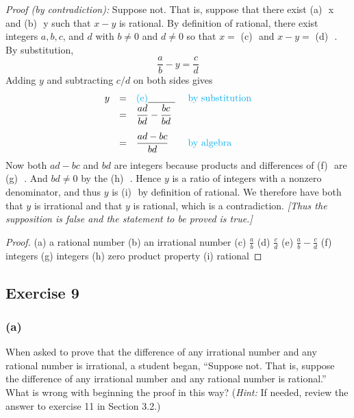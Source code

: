 \documentclass[14pt]{extarticle}
\newcommand{\dps}{\displaystyle}
\newcommand{\fbl}{\underline{\hspace{1cm}}\,\,}
\newcommand{\cy}{\color{cyan}}
\begin{document}
    {\it Proof (by contradiction):} Suppose not. That is, suppose that there exist {\cy (a)} \fbl x and {\cy (b)} \fbl y such that $x - y$ is rational. By definition of rational, there exist integers $a, b, c$, and $d$ with $b \neq 0$ and $d \neq 0$ so that $x =$ {\cy (c)} \fbl and $x - y =$ {\cy (d)} \fbl. By substitution,
\[
    \frac{a}{b} - y = \frac{c}{d}
\]
Adding $y$ and subtracting $c/d$ on both sides gives
\[
    \begin{array}{rcll}
        y & = & \text{\cy (e)} \fbl               & \text{\cy by substitution} \\
        \vspace{0.3cm}
          & = & \dps\frac{ad}{bd} - \frac{bc}{bd} &                            \\
          & = & \dps\frac{ad - bc}{bd}            & \text{\cy by algebra}      \\
    \end{array}
\]
Now both $ad - bc$ and $bd$ are integers because products and differences of {\cy (f)} \fbl are {\cy (g)} \fbl. And $bd \neq 0$ by the {\cy (h)} \fbl. Hence $y$ is a ratio of integers with a nonzero denominator, and thus $y$ is {\cy (i)} \fbl by definition of rational. We therefore have both that $y$ is irrational and that $y$ is rational, which is a contradiction. {\it[Thus the supposition is false and the
            statement to be proved is true.]}

\begin{proof}
    (a) a rational number
    (b) an irrational number
    (c) $\frac{a}{b}$
    (d) $\frac{c}{d}$
    (e) $\frac{a}{b} - \frac{c}{d}$
    (f) integers
    (g) integers
    (h) zero product property
    (i) rational
\end{proof}

\subsection{Exercise 9}

\subsubsection{(a)}
When asked to prove that the difference of any irrational number and any rational number is irrational, a student began, “Suppose not. That is, suppose the difference of any irrational number and any rational number is rational.” What is wrong with beginning the proof in this way? ({\it Hint:} If needed, review the answer to exercise 11 in Section 3.2.)
\end{document}
